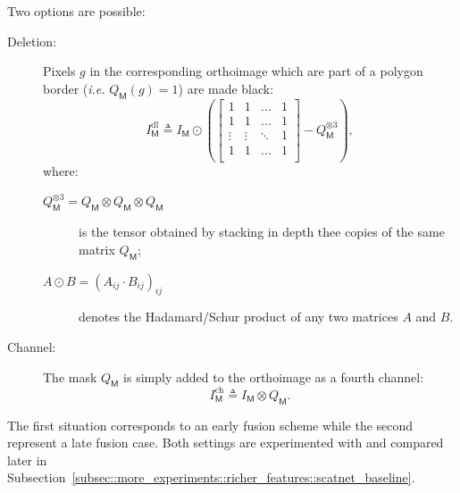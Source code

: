             Two options are possible:
            \begin{description}
                \item[Deletion:] Pixels \(g\) in the corresponding orthoimage which are part of a polygon border (\textit{i.e.} \(Q_{\mathsf{M}}(g) = 1\)) are made black:
                        \begin{equation}
                            \label{eq::deletion_orthoimage}
                            I^{\text{dl}}_{\mathsf{M}} \triangleq I_{\mathsf{M}} \odot \left(\begin{bmatrix}
                                1 & 1 & \dots & 1\\
                                1 & 1 & \dots & 1\\
                                \vdots & \vdots & \ddots & 1\\
                                1 & 1 & \dots & 1\\
                            \end{bmatrix} - Q_{\mathsf{M}}^{\otimes 3}\right),
                        \end{equation}
                        where:
                        \begin{description}
                            \item[\(Q_{\mathsf{M}}^{\otimes 3} = Q_{\mathsf{M}} \otimes Q_{\mathsf{M}} \otimes Q_{\mathsf{M}}\)] is the tensor obtained by stacking in depth thee copies of the same matrix \(Q_{\mathsf{M}}\);
                            \item[\(A \odot B  = \left(A_{ij} \cdot B_{ij} \right)_{ij}\)] denotes the Hadamard/Schur product of any two matrices \(A\) and \(B\).
                        \end{description}
                \item[Channel:] The mask \(Q_{\mathsf{M}}\) is simply added to the orthoimage as a fourth channel:
                        \begin{equation}
                            \label{eq::channel_orthoimage}
                            I^{\text{ch}}_{\mathsf{M}} \triangleq I_{\mathsf{M}} \otimes Q_{\mathsf{M}}.
                        \end{equation}
            \end{description}
            The first situation corresponds to an early fusion scheme while the second represent a late fusion case.
            Both settings are experimented with and compared later in Subsection~\ref{subsec::more_experiments::richer_features::scatnet_baseline}.\\

